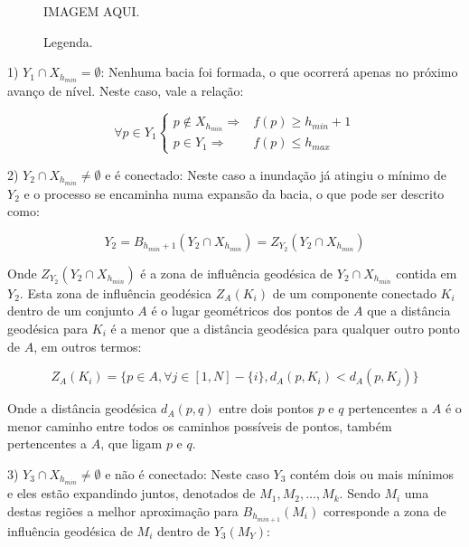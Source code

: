 \begin{figure}[H]
  \begin{center}
    IMAGEM AQUI.
  \end{center}
  \caption{ Legenda. }
  \label{fig:situacoes_inundacao}
\end{figure}

1) $ Y_1 \cap X_{h_{min}} = \emptyset $: Nenhuma bacia foi formada, o que ocorrerá
apenas no próximo avanço de nível. Neste caso, vale a relação:

\begin{equation}\label{eq:watershed_caso1}
  \forall p \in Y_1 \left\{
    \begin{array}{rc}
      p \notin X_{h_{min}} \Rightarrow & f(p) \ge h_{min} + 1 \\
                 p \in Y_1 \Rightarrow & f(p) \le h_{max}
    \end{array}
  \right.
\end{equation}

2) $ Y_2 \cap X_{h_{min}} \neq \emptyset $ e é conectado: Neste caso a inundação já atingiu o
mínimo de $ Y_2 $ e o processo se encaminha numa expansão da bacia, o que pode
ser descrito como:

\begin{equation}\label{eq:watershed_caso21}
  Y_2 = B_{h_{min} + 1}(Y_2 \cap X_{h_{min}}) = Z_{Y_2}(Y_2 \cap X_{h_{min}})
\end{equation}

Onde $ Z_{Y_2}(Y_2 \cap X_{h_{min}}) $ é a zona de influência geodésica de
$ Y_2 \cap X_{h_{min}} $ contida em $ Y_2 $. Esta zona de influência
geodésica $ Z_A(K_i) $ de um componente conectado $ K_i $ dentro de um conjunto $ A $
é o lugar geométricos dos pontos
de $ A $ que a distância geodésica para $ K_i $ é a menor que a distância
geodésica para qualquer outro ponto de $ A $, em outros termos:

\begin{equation}\label{eq:watershed_caso22}
  Z_A(K_i) = \{ p \in A, \forall j \in [1, N] - \{ i \}, d_A(p, K_i) < d_A(p, K_j) \}
\end{equation}

Onde a distância geodésica $ d_A(p, q) $ entre dois pontos $ p $ e $ q $
pertencentes a $ A $ é o menor caminho entre todos os caminhos possíveis de
pontos, também pertencentes a $ A $, que ligam $ p $ e $ q $.

3) $ Y_3 \cap X_{h_{min}} \neq \emptyset $ e não é conectado: Neste caso $ Y_3 $
contém dois ou mais mínimos e eles estão expandindo juntos, denotados de
$ M_1, M_2, …, M_k $. Sendo $ M_i $ uma destas regiões a melhor aproximação
para $ B_{h_{min + 1}}(M_i) $ corresponde a zona de influência geodésica de $ M_i $
dentro de $ Y_3(M_Y)$:

